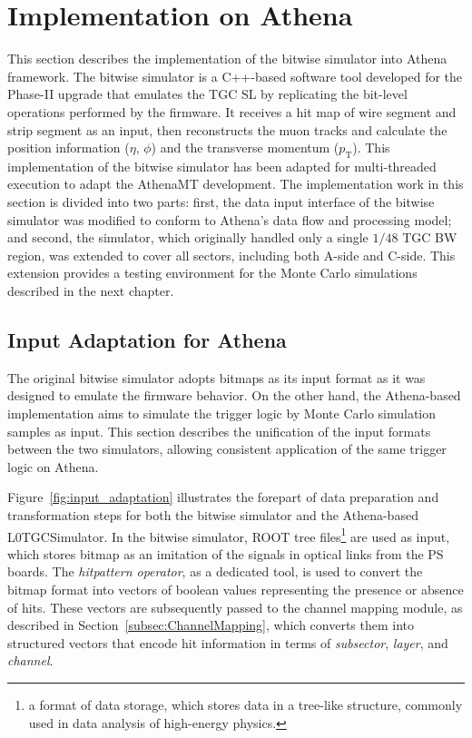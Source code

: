 \section{Implementation on Athena} \label{sec:ImplementationOnAthena}
This section describes the implementation of the bitwise simulator into Athena framework. The bitwise simulator is a C++-based software tool developed for the Phase-II upgrade that emulates the TGC SL by replicating the bit-level operations performed by the firmware. It receives a hit map of wire segment and strip segment as an input, then reconstructs the muon tracks and calculate the position information ($\eta$, $\phi$) and the transverse momentum ($p_\mathrm{T}$). This implementation of the bitwise simulator has been adapted for multi-threaded execution to adapt the AthenaMT development. The implementation work in this section is divided into two parts: first, the data input interface of the bitwise simulator was modified to conform to Athena's data flow and processing model; and second, the simulator, which originally handled only a single \(1/48\) TGC BW region, was extended to cover all sectors, including both A-side and C-side. This extension provides a testing environment for the Monte Carlo simulations described in the next chapter.
\subsection{Input Adaptation for Athena} \label{subsec:InputAdaptation}
The original bitwise simulator adopts bitmaps as its input format as it was designed to emulate the firmware behavior. On the other hand, the Athena-based implementation aims to simulate the trigger logic by Monte Carlo simulation samples as input. This section describes the unification of the input formats between the two simulators, allowing consistent application of the same trigger logic on Athena.

Figure~\ref{fig:input_adaptation} illustrates the forepart of data preparation and transformation steps for both the bitwise simulator and the Athena-based L0TGCSimulator. In the bitwise simulator, ROOT tree files\footnote{a format of data storage, which stores data in a tree-like structure, commonly used in data analysis of high-energy physics. } are used as input, which stores bitmap as an imitation of the signals in optical links from the PS boards. The \textit{hitpattern operator}, as a dedicated tool, is used to convert the bitmap format into vectors of boolean values representing the presence or absence of hits. These vectors are subsequently passed to the channel mapping module, as described in Section~\ref{subsec:ChannelMapping}, which converts them into structured vectors that encode hit information in terms of \textit{subsector}, \textit{layer}, and \textit{channel}.

